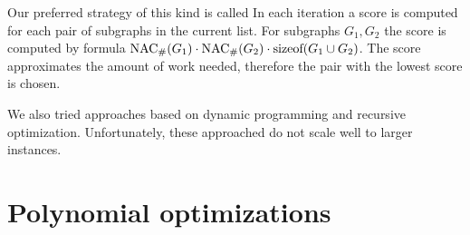 Our preferred strategy of this kind is called \Score{}
In each iteration a score is computed for each pair of subgraphs in the current list.
For subgraphs \( G_1, G_2 \) the score is computed by formula
\( \operatorname{NAC}_{\#} (G_1) \cdot \operatorname{NAC}_{\#} (G_2) \cdot \text{sizeof}(G_1 \cup G_2) \).
The score approximates the amount of work needed,
therefore the pair with the lowest score is chosen.

We also tried approaches based on dynamic programming and recursive optimization.
Unfortunately, these approached do not scale well to larger instances.

\section{Polynomial optimizations}%
\label{sec:polynomial_optimizations}
